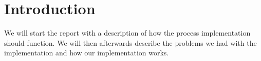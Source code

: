 \documentclass[11pt]{article}
\begin{document}

    \clearpage
    \maketitle
    \thispagestyle{empty}

    \newpage




    \section{Introduction}
    We will start the report with a description of how the process
    implementation should function.  We will then afterwards describe the
    problems we had with the implementation and how our implementation works.
\end{document}
